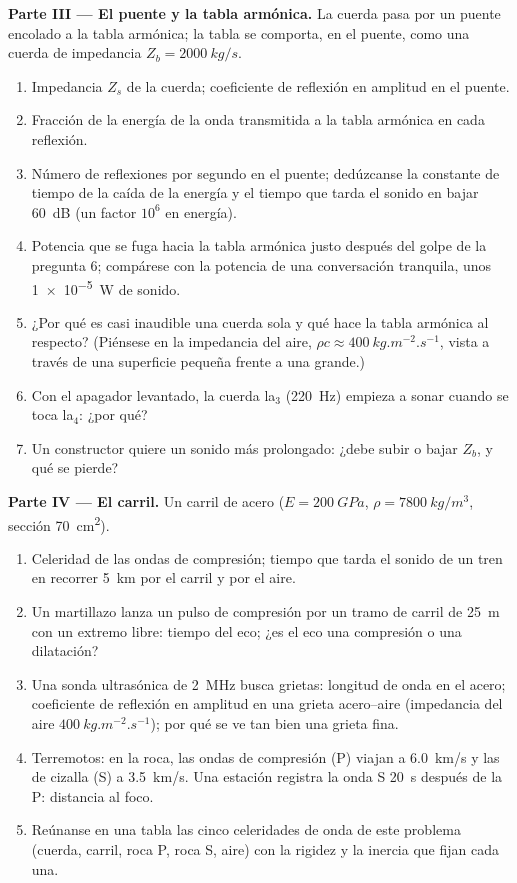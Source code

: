 \begin{problem}
\medskip
\noindent\textbf{Parte III --- El puente y la tabla armónica.}
La cuerda pasa por un puente encolado a la tabla armónica; la tabla se
comporta, en el puente, como una cuerda de impedancia $Z_b = \qty{2000}{kg/s}$.
\begin{enumerate}[resume]
  \item Impedancia $Z_s$ de la cuerda; coeficiente de reflexión en
        amplitud en el puente.
  \item Fracción de la energía de la onda transmitida a la tabla armónica
        en cada reflexión.
  \item Número de reflexiones por segundo en el puente; dedúzcanse la
        constante de tiempo de la caída de la energía y el tiempo que
        tarda el sonido en bajar \qty{60}{dB} (un factor $10^6$ en energía).
  \item Potencia que se fuga hacia la tabla armónica justo después del
        golpe de la pregunta 6; compárese con la potencia de una
        conversación tranquila, unos \qty{1e-5}{W} de sonido.
  \item ¿Por qué es casi inaudible una cuerda sola y qué hace la tabla
        armónica al respecto? (Piénsese en la impedancia del aire,
        $\rho c \approx \qty{400}{kg.m^{-2}.s^{-1}}$, vista a través de una
        superficie pequeña frente a una grande.)
  \item Con el apagador levantado, la cuerda la$_3$ (\qty{220}{Hz}) empieza
        a sonar cuando se toca la$_4$: ¿por qué?
  \item Un constructor quiere un sonido más prolongado: ¿debe subir o
        bajar $Z_b$, y qué se pierde?
\end{enumerate}

\medskip
\noindent\textbf{Parte IV --- El carril.}
Un carril de acero ($E = \qty{200}{GPa}$, $\rho = \qty{7800}{kg/m^3}$, sección
\qty{70}{cm^2}).
\begin{enumerate}[resume]
  \item Celeridad de las ondas de compresión; tiempo que tarda el sonido
        de un tren en recorrer \qty{5}{km} por el carril y por el aire.
  \item Un martillazo lanza un pulso de compresión por un tramo de carril
        de \qty{25}{m} con un extremo libre: tiempo del eco; ¿es el eco una
        compresión o una dilatación?
  \item Una sonda ultrasónica de \qty{2}{MHz} busca grietas: longitud de
        onda en el acero; coeficiente de reflexión en amplitud en una
        grieta acero--aire (impedancia del aire
        $\qty{400}{kg.m^{-2}.s^{-1}}$); por qué se ve tan bien una grieta
        fina.
  \item Terremotos: en la roca, las ondas de compresión (P) viajan a
        \qty{6.0}{km/s} y las de cizalla (S) a \qty{3.5}{km/s}. Una estación
        registra la onda S \qty{20}{s} después de la P: distancia al foco.
  \item Reúnanse en una tabla las cinco celeridades de onda de este
        problema (cuerda, carril, roca P, roca S, aire) con la rigidez y
        la inercia que fijan cada una.
\end{enumerate}
\end{problem}
